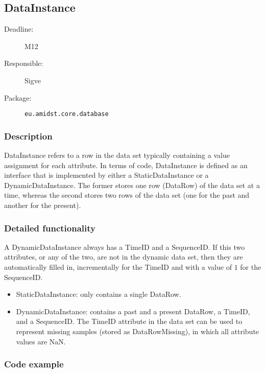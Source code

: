 \newpage
\subsection{DataInstance}
\label{DataInstance:ID}

\begin{description}
\item[Deadline:] M12
\item[Responsible:] Sigve
\item[Package:] \texttt{eu.amidst.core.database}
\end{description}

\subsubsection*{Description}

DataInstance refers to a row in the data set typically containing a value assignment for each attribute. In terms of code, DataInstance is defined as an interface that is implemented by either a StaticDataInstance or a DynamicDataInstance. The former stores one row (DataRow) of the data set at a time, whereas the second stores two rows of the data set (one for the past and another for the present). 

\subsubsection*{Detailed functionality}

A DynamicDataInstance always has a TimeID and a SequenceID. If this two attributes, or any of the two, are not in the dynamic data set, then they are automatically filled in, incrementally for the TimeID and with a value of $1$ for the SequenceID.

\begin{itemize}
\item StaticDataInstance: only contains a single DataRow.

\item DynamicDataInstance: contains a past and a present DataRow, a TimeID, and a SequenceID. The TimeID attribute in the data set can be used to represent missing samples (stored as DataRowMissing), in which all attribute values are NaN.
\end{itemize}

\subsubsection*{Code example}

